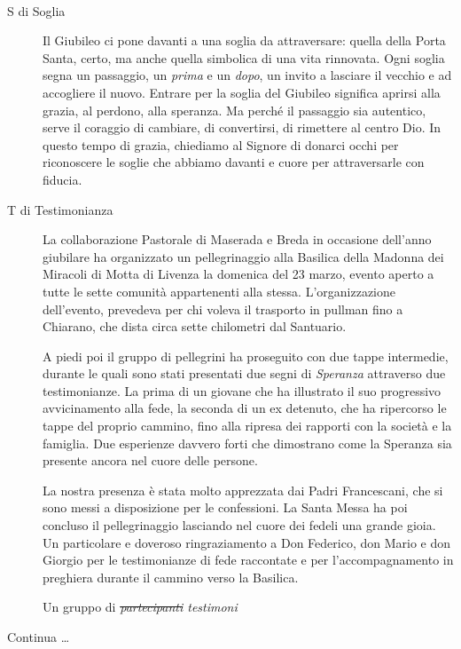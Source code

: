 \newpage
{}
\paragraph{}
\vspace*{-\parskip}
\begin{description}
  \item[S di Soglia] Il Giubileo ci pone davanti a una soglia da attraversare: quella della Porta Santa, certo, ma anche quella simbolica di una vita rinnovata. Ogni soglia segna un passaggio, un \textit{prima} e un \textit{dopo}, un invito a lasciare il vecchio e ad accogliere il nuovo. Entrare per la soglia del Giubileo significa aprirsi alla grazia, al perdono, alla speranza. Ma perché il passaggio sia autentico, serve il coraggio di cambiare, di convertirsi, di rimettere al centro Dio. In questo tempo di grazia, chiediamo al Signore di donarci occhi per riconoscere le soglie che abbiamo davanti e cuore per attraversarle con fiducia.
\end{description}

\begin{description}
  \item[T di Testimonianza] La collaborazione Pastorale di Maserada e Breda in occasione dell'anno giubilare ha organizzato un pellegrinaggio alla Basilica della Madonna dei Miracoli di Motta di Livenza la domenica del 23 marzo, evento aperto a tutte le sette comunità appartenenti alla stessa. L'organizzazione dell'evento, prevedeva per chi voleva il trasporto in pullman fino a Chiarano, che dista circa sette chilometri dal Santuario.

  A piedi poi il gruppo di pellegrini ha proseguito con due tappe intermedie, durante le quali sono stati presentati due segni di \textit{Speranza} attraverso due testimonianze. La prima di un giovane che ha illustrato il suo progressivo avvicinamento alla fede, la seconda di un ex detenuto, che ha ripercorso le tappe del proprio cammino, fino alla ripresa dei rapporti con la società e la famiglia. Due esperienze davvero forti che dimostrano come la Speranza sia presente ancora nel cuore delle persone.

  La nostra presenza è stata molto apprezzata dai Padri Francescani, che si sono messi a disposizione per le confessioni. La Santa Messa ha poi concluso il pellegrinaggio lasciando nel cuore dei fedeli una grande gioia. Un particolare e doveroso ringraziamento a Don Federico, don Mario e don Giorgio per le testimonianze di fede raccontate e per l'accompagnamento in preghiera durante il cammino verso la Basilica.

  Un gruppo di \textit{\sout{partecipanti} testimoni}
\end{description}

Continua \ldots

